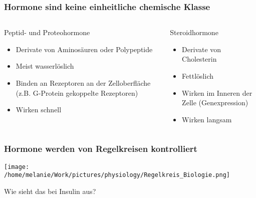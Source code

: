 \documentclass{beamer}
\begin{document}
\begin{frame}
\frametitle{Hormone sind keine einheitliche chemische Klasse}

\begin{columns}[t]

\begin{column}{5cm}
\begin{block}{Peptid- und Proteohormone}

\begin{itemize}
\item
Derivate von Aminosäuren oder Polypeptide
\item
Meist wasserlöslich
\item
Binden an Rezeptoren an der Zelloberfläche (z.B. G-Protein gekoppelte Rezeptoren)
\item
Wirken schnell
\end{itemize}
\end{block}

\end{column}

\begin{column}{5cm}

\begin{block}{Steroidhormone}

\begin{itemize}
\item
Derivate von Cholesterin
\item
Fettlöslich
\item
Wirken im Inneren der Zelle (Genexpression)
\item
Wirken langsam
\end{itemize}
\end{block}

\end{column}


\end{columns}



\end{frame}



\begin{frame}
\frametitle{Hormone werden von Regelkreisen kontrolliert}

\begin{center}
\texttt{[image: /home/melanie/Work/pictures/physiology/Regelkreis\_Biologie.png]}
\end{center}

\pause

\textcolor{theme}{Wie sieht das bei Insulin aus?}


\end{frame}
\end{document}
